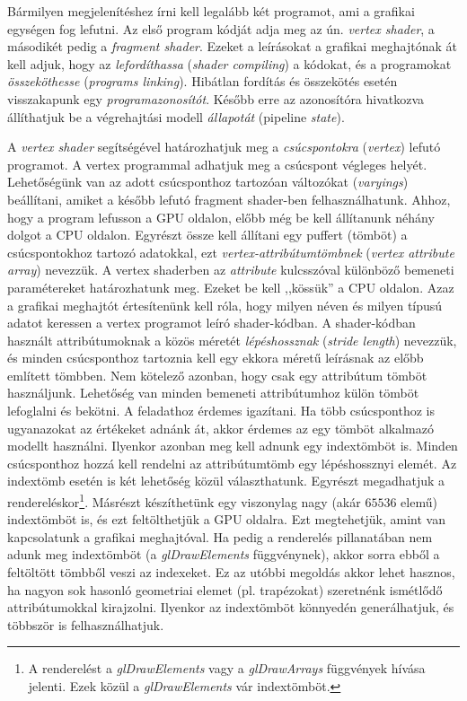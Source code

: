 \documentclass[12pt]{report}
\theoremstyle{definition}
\newcommand{\inenglish}[1]{\textsl{#1}}
\newcommand{\func}[1]{{\textsl{#1}}}
\begin{document}
Bármilyen megjelenítéshez írni kell legalább két programot, ami a grafikai
egységen fog lefutni. Az első program kódját adja meg az ún. \emph{vertex
shader}, a másodikét pedig a \emph{fragment shader}. Ezeket a leírásokat a
grafikai meghajtónak át kell adjuk, hogy az \emph{lefordíthassa}
(\inenglish{shader compiling}) a kódokat, és a programokat \emph{összeköthesse}
(\inenglish{programs linking}). Hibátlan fordítás és összekötés esetén
visszakapunk egy \emph{programazonosítót}. Később erre az azonosítóra
hivatkozva állíthatjuk be a végrehajtási modell \emph{állapotát} (pipeline
\inenglish{state}).

A \emph{vertex shader} segítségével határozhatjuk meg a \emph{csúcspontokra}
(\inenglish{vertex}) lefutó programot. A vertex programmal adhatjuk meg a
csúcspont végleges helyét.  Lehetőségünk van az adott csúcsponthoz tartozóan
változókat (\inenglish{varyings}) beállítani, amiket a később lefutó fragment
shader-ben felhasználhatunk. Ahhoz, hogy a program lefusson a GPU oldalon,
előbb még be kell állítanunk néhány dolgot a CPU oldalon. Egyrészt össze kell
állítani egy puffert (tömböt) a csúcspontokhoz tartozó adatokkal, ezt
\emph{vertex-attribútumtömbnek} (\inenglish{vertex attribute array}) nevezzük.
A vertex shaderben az \func{attribute} kulcsszóval különböző bemeneti
paramétereket határozhatunk meg. Ezeket be kell ,,kössük'' a CPU oldalon. Azaz
a grafikai meghajtót értesítenünk kell róla, hogy milyen néven és milyen típusú
adatot keressen a vertex programot leíró shader-kódban. A shader-kódban
használt attribútumoknak a közös méretét \emph{lépéshossznak}
(\inenglish{stride length}) nevezzük, és minden csúcsponthoz tartoznia kell egy
ekkora méretű leírásnak az előbb említett tömbben. Nem kötelező azonban, hogy
csak egy attribútum tömböt használjunk. Lehetőség van minden bemeneti
attribútumhoz külön tömböt lefoglalni és bekötni. A feladathoz érdemes
igazítani. Ha több csúcsponthoz is ugyanazokat az értékeket adnánk át, akkor
érdemes az egy tömböt alkalmazó modellt használni. Ilyenkor azonban meg kell
adnunk egy indextömböt is. Minden csúcsponthoz hozzá kell rendelni az
attribútumtömb egy lépéshossznyi elemét. Az indextömb esetén is két lehetőség
közül választhatunk. Egyrészt megadhatjuk a rendereléskor\footnote{A
renderelést a \func{glDrawElements} vagy a \func{glDrawArrays} függvények
hívása jelenti. Ezek közül a \func{glDrawElements} vár indextömböt.}. Másrészt
készíthetünk egy viszonylag nagy (akár $65536$ elemű) indextömböt is, és ezt
feltölthetjük a GPU oldalra. Ezt megtehetjük, amint van kapcsolatunk a grafikai
meghajtóval. Ha pedig a renderelés pillanatában nem adunk meg indextömböt (a
\func{glDrawElements} függvénynek), akkor sorra ebből a feltöltött tömbből
veszi az indexeket. Ez az utóbbi megoldás akkor lehet hasznos, ha nagyon sok
hasonló geometriai elemet (pl. trapézokat) szeretnénk ismétlődő attribútumokkal
kirajzolni. Ilyenkor az indextömböt könnyedén generálhatjuk, és többször is
felhasználhatjuk.
\end{document}
